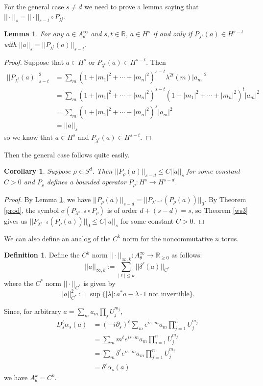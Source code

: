 \documentclass[10pt]{article}
\newtheorem{cor}[thm]{Corollary}
\newtheorem{lem}[thm]{Lemma}
\theoremstyle{remark}
\theoremstyle{definition}
\newtheorem{define}[thm]{Definition}
\begin{document}
For the general case $s\ne d$ we need to prove a lemma saying that
$||\cdot||_s=||\cdot||_{s-t}\circ P_{\lambda^t}$.
\begin{lem}\label{sn3}
For any $a\in A_{\theta}^{\infty}$ and $s,t\in\mathbb R$,
$a\in H^s$ if and only if
$P_{\lambda^t}(a)\in H^{s-t}$ with $||a||_s=||P_{\lambda^t}(a)||_{s-t}$.
\end{lem}
\begin{proof}
Suppose that $a\in H^s$ or $P_{\lambda^t}(a)\in H^{s-t}$. Then
\begin{align*}
||P_{\lambda^t}(a)||_{s-t}^2
&= \sum_{m}(1+|m_1|^2+\cdots+|m_n|^2)^{s-t}\lambda^{2t}(m)|a_m|^2 \\
&= \sum_{m}(1+|m_1|^2+\cdots+|m_n|^2)^{s-t}(1+|m_1|^2+\cdots+|m_n|^2)^t|a_m|^2\\
&= \sum_{m}(1+|m_1|^2+\cdots+|m_n|^2)^s|a_m|^2 \\
&= ||a||_s
\end{align*}
so we know that $a\in H^s$ and $P_{\lambda^t}(a)\in H^{s-t}$.
\end{proof}
Then the general case follows quite easily.
\begin{cor}
Suppose $\rho\in S^d$. Then $||P_{\rho}(a)||_{s-d}\le C||a||_s$ for
some constant $C>0$ and $P_{\rho}$ defines a bounded operator
$P_{\rho}:H^s\rightarrow H^{s-d}$.
\end{cor}
\begin{proof}
By Lemma \ref{sn3}, we have
$||P_{\rho}(a)||_{s-d}=||P_{\lambda^{s-d}}(P_{\rho}(a))||_0$.
By Theorem \ref{prod}, the symbol
$\sigma(P_{\lambda^{s-d}}\circ P_{\rho})$ is of order $d+(s-d)=s$,
so Theorem \ref{ws3} gives us
$||P_{\lambda^{s-d}}(P_{\rho}(a))||_0\le C||a||_s$ for some constant $C>0$.
\end{proof}
We can also define an analog of the $C^k$ norm for the noncommutative $n$ torus.
\begin{define}
Define the $C^k$ norm
$||\cdot||_{\infty,k}:A_{\theta}^{\infty}\rightarrow\mathbb R_{\ge 0}$
as follows:
$$||a||_{\infty,k}:=\sum_{|\ell|\le k}||\delta^{\ell}(a)||_{C^*}$$
where the $C^*$ norm $||\cdot||_{C^*}$ is given by
$$||a||_{C^*}^2:=\sup\{|\lambda|:a^*a-\lambda\cdot 1\text{ not invertible}\}.$$
\end{define}
Since, for arbitrary $a=\sum_ma_m\prod_jU_j^{m_j}$,
\begin{align*}
D_s^{\ell}\alpha_s(a)
&=(-i\partial_s)^{\ell}\sum_me^{is\cdot m}a_m\prod_{j=1}^nU_j^{m_j} \\
&=\sum_m m^{\ell}e^{is\cdot m}a_m\prod_{j=1}^nU_j^{m_j} \\
&=\sum_m\delta^{\ell}e^{is\cdot m}a_m\prod_{j=1}^nU_j^{m_j} \\
&=\delta^{\ell}\alpha_s(a)
\end{align*}
we have $A_{\theta}^k=C^k$.
\end{document}
